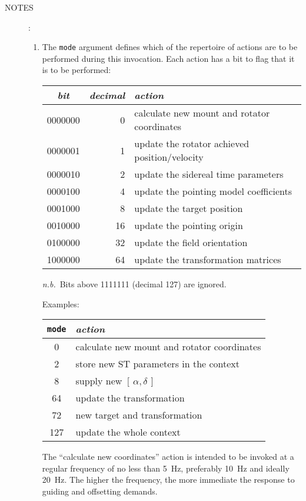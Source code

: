 \documentclass[12pt,fleqn,twoside]{article}
\renewcommand{\_}{{\tt\char'137}}     %
\newcommand{\radec}     {$[\,\alpha,\delta\,]$}
\newcommand{\notes}[1]
{
  \goodbreak
  \begin{description}
    \item[NOTES]: \nopagebreak
        #1
  \end{description}
  \vspace{-3ex}
}
\begin{document}
\notes{
\begin{enumerate}
\setlength{\parskip}{\medskipamount}
\item The {\tt mode} argument defines which of the repertoire of
      actions are to be performed during this invocation.  Each action
      has a bit to flag that it is to be performed:
      \begin{center}
      \begin{tabular}{|c|r|l|} \hline
      {\it bit} & {\it decimal} & {\it action} \\ \hline \hline
      0000000 &  0 & calculate new mount and rotator coordinates \\
      0000001 &  1 & update the rotator achieved position/velocity \\
      0000010 &  2 & update the sidereal time parameters \\
      0000100 &  4 & update the pointing model coefficients \\
      0001000 &  8 & update the target position \\
      0010000 & 16 & update the pointing origin \\
      0100000 & 32 & update the field orientation \\
      1000000 & 64 & update the transformation matrices \\ \hline
      \end{tabular}
      \end{center}
      {\it n.b.}~Bits above 1111111 (decimal 127) are ignored.

      Examples:
      \begin{center}
      \begin{tabular}{|c|l|} \hline
      {\tt mode} & {\it action} \\ \hline \hline
        0 & calculate new mount and rotator coordinates \\
        2 & store new ST parameters in the context \\
        8 & supply new \radec \\
       64 & update the transformation \\
       72 & new target and transformation \\
      127 & update the whole context \\ \hline
      \end{tabular}
      \end{center}

      The ``calculate new coordinates'' action is intended to be
      invoked at a regular frequency of no less than 5~Hz, preferably
      10~Hz and ideally 20~Hz.  The higher the frequency, the more
      immediate the response to guiding and offsetting demands.


\end{enumerate}}
\end{document}
